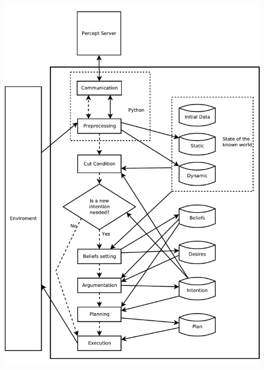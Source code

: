 \documentclass[pdf,xcolor=svgnames]{beamer}
\begin{document}

\begin{frame}
\center
 \includegraphics[height=\textheight]{agent_architecture.pdf}

\end{frame}
\end{document}
